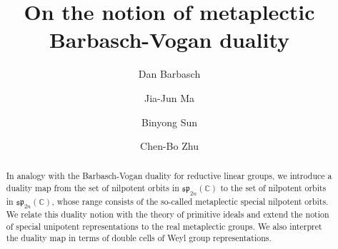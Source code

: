\documentclass[12pt,a4paper]{amsart}
\newcommand{\BC}{{\mathbb {C}}}
\newcommand{\p}{\mathfrak p}
\newcommand{\s}{\mathfrak s}
\numberwithin{equation}{section}
\theoremstyle{remark}
\begin{document}
\title[]{On the notion of metaplectic Barbasch-Vogan duality}

\author [D. Barbasch] {Dan Barbasch}
\address{Department of Mathematics\\
Cornell University\\
Ithaca, NY14853, USA}

\author [J.-J. Ma] {Jia-Jun Ma}
\address{School of Mathematical Sciences\\
  Xiamen University\\
  Xiamen, China} 


\author [B. Sun] {Binyong Sun}
\address{Institute for Advanced Study in Mathematics, Zhejiang University\\
  Hangzhou, 310058, China}

\author [C.-B. Zhu] {Chen-Bo Zhu}
\address{Department of Mathematics\\
  National University of Singapore\\
  10 Lower Kent Ridge Road, Singapore 119076} 




 


\begin{abstract}
In analogy with the Barbasch-Vogan duality for reductive linear groups, we introduce a duality map from the set of nilpotent orbits in $\s\p_{2n}(\BC)$ to the set of nilpotent orbits in $\s\p_{2n}(\BC)$, whose range consists of the so-called metaplectic special nilpotent orbits. We relate this duality notion with the theory of primitive ideals and extend the notion of special unipotent representations to the real metaplectic groups. We also interpret the duality map in terms of double cells of Weyl group representations.
  \end{abstract}
\end{document}
